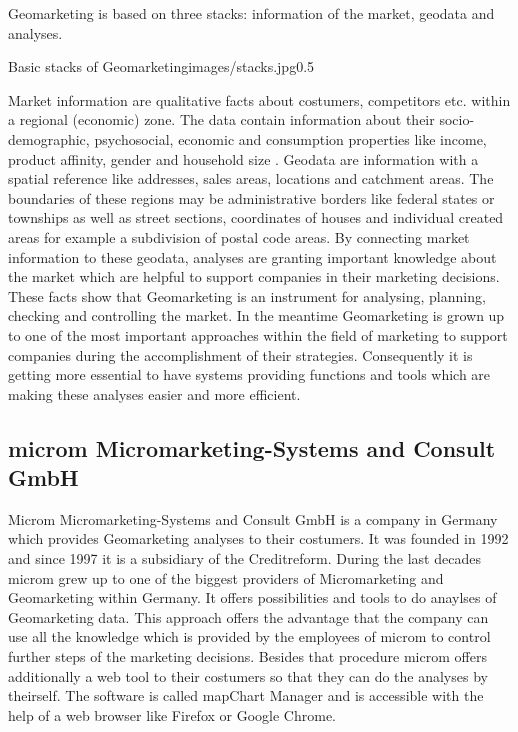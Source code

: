 Geomarketing is based on three stacks: information of the market, geodata and analyses. 

\begin{figurevarSize}{Basic stacks of Geomarketing}{images/stacks.jpg}{0.5}\end{figurevarSize}

Market information are qualitative facts about costumers, competitors etc. within a regional (economic) zone. The data contain information about their socio-demographic, psychosocial, economic and consumption properties like income, product affinity, gender and household size \cite{tappert}. Geodata are information with a spatial reference like addresses, sales areas, locations and catchment areas. The boundaries of these regions may be administrative borders like federal states or townships as well as street sections, coordinates of houses and individual created areas for example a subdivision of postal code areas. By connecting market information to these geodata, analyses are granting important knowledge about the market which are helpful to support companies in their marketing decisions. These facts show that Geomarketing is an instrument for analysing, planning, checking and controlling the market. In the meantime Geomarketing is grown up to one of the most important approaches within the field of marketing to support companies during the accomplishment of their strategies. Consequently it is getting more essential to have systems providing functions and tools which are making these analyses easier and more efficient. 

\subsection{microm Micromarketing-Systems and Consult GmbH}
Microm Micromarketing-Systems and Consult GmbH is a company in Germany which provides Geomarketing analyses to their costumers. It was founded in 1992 and since 1997 it is a subsidiary of the Creditreform. During the last decades microm grew up to one of the biggest providers of Micromarketing and Geomarketing within Germany. It offers possibilities and tools to do anaylses of Geomarketing data. This approach offers the advantage that the company can use all the knowledge which is provided by the employees of microm to control further steps of the marketing decisions. Besides that procedure microm offers additionally a web tool to their costumers so that they can do the analyses by theirself. The software is called mapChart Manager and is accessible with the help of a web browser like Firefox or Google Chrome. 

